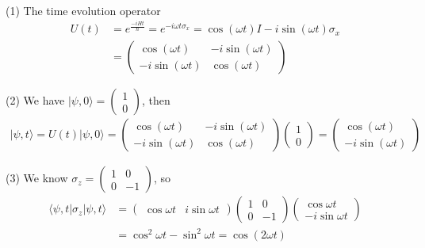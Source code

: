 \documentclass[UTF8,12pt]{article} %
\makeatletter
\newenvironment{proof}[1][\protect\proofname]{\par
\normalfont\topsep6\p@\@plus6\p@\relax
\trivlist
\itemindent\parindent
\item[\hskip\labelsep
\scshape
#1]\ignorespaces
}{%
\endtrivlist\@endpefalse
}
\renewcommand{\proofname}{\it{Solution}}
\makeatother
\begin{document}
\begin{proof}[Solution]~\par
(1) The time evolution operator
\begin{align}
U(t) &= e^{\frac{-iHt}{\hbar}} = e^{-i\omega t\sigma_{x}} = \cos(\omega t)I - i\sin(\omega t)\sigma_{x} \\
&= \begin{pmatrix}\cos(\omega t) & -i\sin(\omega t)\\-i\sin(\omega t) & \cos(\omega t)\end{pmatrix}
\end{align}\par
(2) We have $|\psi,0\rangle = \begin{pmatrix}1\\0\end{pmatrix}$, then
\begin{align}
|\psi,t\rangle = U(t)|\psi,0\rangle = \begin{pmatrix}\cos(\omega t) & -i\sin(\omega t)\\-i\sin(\omega t) & \cos(\omega t)\end{pmatrix} \begin{pmatrix}1\\0\end{pmatrix} = \begin{pmatrix}\cos(\omega t)\\-i\sin(\omega t)\end{pmatrix}
\end{align}\par
(3) We know $\sigma_{z} = \begin{pmatrix}1 & 0\\0 & -1\end{pmatrix}$, so
\begin{align}
\langle\psi,t|\sigma_{z}|\psi,t\rangle &= \begin{pmatrix}\cos\omega t& i\sin\omega t\end{pmatrix}\begin{pmatrix}1 & 0\\0 & -1\end{pmatrix}\begin{pmatrix}\cos\omega t \\ -i\sin\omega t\end{pmatrix} \\
&= \cos^{2}\omega t - \sin^{2}\omega t = \cos(2\omega t)
\end{align}
\end{proof}
\end{document}
